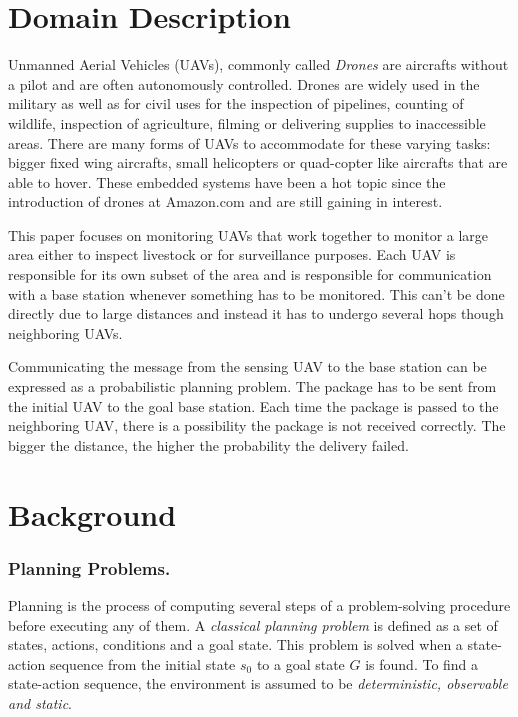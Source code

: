 \documentclass[runningheads,a4paper]{llncs}
\newcommand\myworries[1]{\textcolor{red}{#1}}
\begin{document}

\section{Domain Description}
\label{sec:domaind}

Unmanned Aerial Vehicles (UAVs), commonly called \emph{Drones} are aircrafts
without a pilot and are often autonomously controlled. Drones are widely used in the
military as well as for civil uses for the inspection of pipelines, counting of
wildlife, inspection of agriculture, filming or delivering supplies to inaccessible areas.
There are many forms of UAVs to accommodate for these varying tasks: bigger fixed wing
aircrafts, small helicopters or quad-copter like aircrafts that are able to hover. These
embedded systems have been a hot topic since the introduction of drones at Amazon.com and
are still gaining in interest.

This paper focuses on monitoring UAVs that work together to monitor a large area
either to inspect livestock or for surveillance purposes. Each UAV is responsible
for its own subset of the area and is responsible for communication with a base
station whenever something has to be monitored. This can't be done directly due to
large distances and instead it has to undergo several hops though neighboring UAVs.

Communicating the message from the sensing UAV to the base station can be
expressed as a probabilistic planning problem. The package has to be sent from
the initial UAV to the goal base station.  Each time the package is passed to the neighboring UAV,
there is a possibility the package is not received correctly. The bigger the
distance, the higher the probability the delivery failed.


\section{Background}
\label{sec:background}

\subsubsection{Planning Problems. } Planning is the process of computing several steps of a problem-solving procedure before executing any of them. A \emph{classical planning problem} is defined as a set of states, actions, conditions and a goal state. This problem is solved when a state-action sequence from the initial state $s_0$ to a goal state $G$ is found. To find a state-action sequence, the environment is assumed to be \emph{deterministic, observable and static}.
\end{document}
